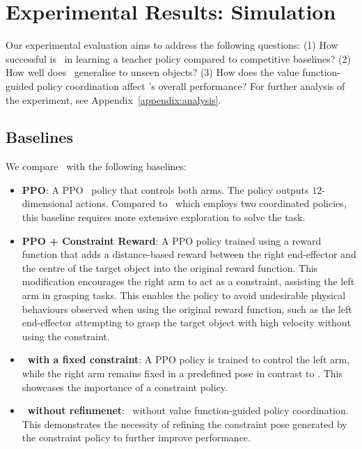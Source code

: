 \section{Experimental Results: Simulation}

Our experimental evaluation aims to address the following questions: (1) How successful is \ourmethod~in learning a teacher policy compared to competitive baselines? (2) How well does \ourmethod~generalise to unseen objects? 
(3) How does the value function-guided policy coordination affect \ourmethod's overall performance?
For further analysis of the experiment, see Appendix~\ref{appendix:analysis}.




\subsection{Baselines}
We compare \ourmethod~with the following baselines:

\begin{itemize}
    \item \textbf{PPO}: A PPO~\cite{schulman2017proximal} policy that controls both arms. The policy outputs $12$-dimensional actions. Compared to \ourmethod~which employs two coordinated policies, this baseline requires more extensive exploration to solve the task.
    \item \textbf{PPO + Constraint Reward}: A PPO policy trained using a reward function that adds a distance-based reward between the right end-effector and the centre of the target object into the original reward function. This modification encourages the right arm to act as a constraint, assisting the left arm in grasping tasks. This enables the policy to avoid undesirable physical behaviours observed when using the original reward function, such as the left end-effector attempting to grasp the target object with high velocity without using the constraint.
    \item \textbf{\ourmethod~with a fixed constraint}: A PPO policy is trained to control the left arm, while the right arm remains fixed in a predefined pose in contrast to \ourmethod. This showcases the importance of a constraint policy.
    \item \textbf{\ourmethod~without refinmenet}: \ourmethod~without value function-guided policy coordination. This demonstrates the necessity of refining the constraint pose generated by the constraint policy to further improve performance. 
\end{itemize}

